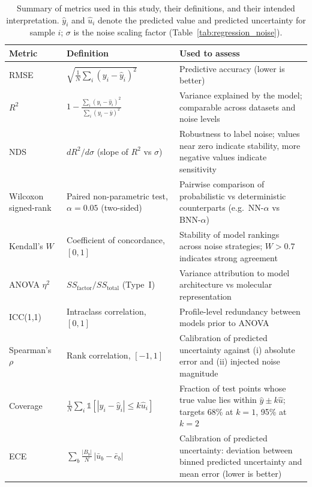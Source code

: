 \documentclass[pdflatex,sn-basic]{sn-jnl}%
\theoremstyle{thmstyleone}%
\theoremstyle{thmstyletwo}%
\theoremstyle{thmstylethree}%
\begin{document}
\begin{table}[htbp]
\centering
\small
\begin{tabular}{p{2.5cm} p{4.5cm} p{6cm}}
\toprule
\textbf{Metric} & \textbf{Definition} & \textbf{Used to assess} \\
\midrule
RMSE
  & $\sqrt{\frac{1}{N}\sum_i (y_i - \hat{y}_i)^2}$
  & Predictive accuracy (lower is better) \\
$R^2$
  & $1 - \frac{\sum_i (y_i - \hat{y}_i)^2}{\sum_i (y_i - \bar{y})^2}$
  & Variance explained by the model; comparable across datasets and noise levels \\
NDS
  & $dR^2 / d\sigma$ (slope of $R^2$ vs $\sigma$)
  & Robustness to label noise; values near zero indicate stability, more negative values indicate sensitivity \\
Wilcoxon signed-rank
  & Paired non-parametric test, $\alpha=0.05$ (two-sided)
  & Pairwise comparison of probabilistic vs deterministic counterparts (e.g.\ NN-$\alpha$ vs BNN-$\alpha$) \\
Kendall's $W$
  & Coefficient of concordance, $[0, 1]$
  & Stability of model rankings across noise strategies; $W > 0.7$ indicates strong agreement \\
ANOVA $\eta^2$
  & $SS_{\text{factor}} / SS_{\text{total}}$ (Type~I)
  & Variance attribution to model architecture vs molecular representation \\
ICC(1,1)
  & Intraclass correlation, $[0, 1]$
  & Profile-level redundancy between models prior to ANOVA \\
Spearman's $\rho$
  & Rank correlation, $[-1, 1]$
  & Calibration of predicted uncertainty against (i) absolute error and (ii) injected noise magnitude \\
Coverage
  & $\frac{1}{N}\sum_i \mathbb{1}[|y_i - \hat{y}_i| \le k\hat{u}_i]$
  & Fraction of test points whose true value lies within $\hat{y}\pm k\hat{u}$; targets 68\% at $k=1$, 95\% at $k=2$ \\
ECE
  & $\sum_b \frac{|B_b|}{N}\,|\bar{u}_b - \bar{e}_b|$
  & Calibration of predicted uncertainty: deviation between binned predicted uncertainty and mean error (lower is better) \\
\bottomrule
\end{tabular}
\caption{Summary of metrics used in this study, their definitions, and their
intended interpretation. $\hat{y}_i$ and $\hat{u}_i$ denote the predicted
value and predicted uncertainty for sample $i$; $\sigma$ is the noise scaling
factor (Table~\ref{tab:regression_noise}).}
\label{tab:metrics_summary}
\end{table}
\end{document}
